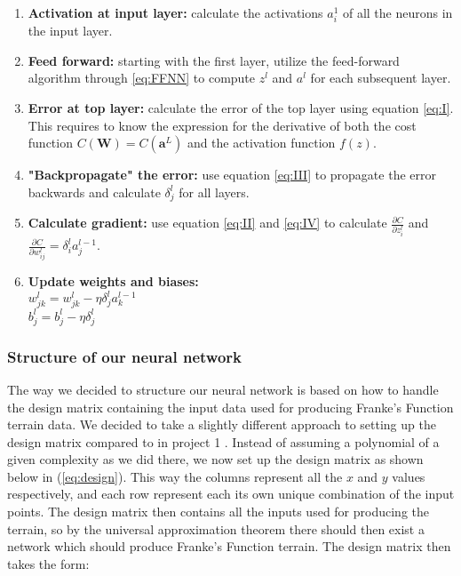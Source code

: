 \documentclass[a4paper, UKenglish, 11pt]{uiomaster}
\begin{document}
\begin{enumerate}
  \item \textbf{Activation at input layer:} calculate the activations $a_i^1$ of all the neurons in the input layer.
  \item \textbf{Feed forward:} starting with the first layer, utilize the feed-forward algorithm through \ref{eq:FFNN} to compute $z^{l}$ and $a^{l}$ for each subsequent layer.
  \item \textbf{Error at top layer:} calculate the error of the top layer using equation \ref{eq:I}. This requires to know the expression for the derivative of both the cost function $C(\boldsymbol{W}) = C(\boldsymbol{a}^L)$ and the activation function $f(z)$.
  \item \textbf{"Backpropagate" the error:} use equation \ref{eq:III} to propagate the error backwards and calculate $\delta_j^l$ for all layers.
  \item \textbf{Calculate gradient:} use equation \ref{eq:II} and \ref{eq:IV} to calculate $\frac{\partial C}{\partial z^l_{i}}$ and $\frac{\partial C}{\partial w^l_{ij}} = \delta_i^l a_j^{l-1}$. \newline
  \item \textbf{Update weights and biases:} \\[2pt] $w^l_{jk}=w^l_{jk}-\eta\delta^l_ja^{l-1}_k$ \\[2pt] $b_j^l = b_j^l - \eta \delta_j^l$
\end{enumerate}

\subsubsection*{Structure of our neural network}

The way we decided to structure our neural network is based on how to handle the design matrix containing the input data used for producing Franke's Function terrain data. We decided to take a slightly different approach to setting up the design matrix compared to in project 1 \cite{97}. Instead of assuming a polynomial of a given complexity as we did there, we now set up the design matrix as shown below in (\ref{eq:design}). This way the columns represent all the $x$ and $y$ values respectively, and each row represent each its own unique combination of the input points. The design matrix then contains all the inputs used for producing the terrain, so by the universal approximation theorem there should then exist a network which should produce Franke's Function terrain. The design matrix then takes the form:
\end{document}
